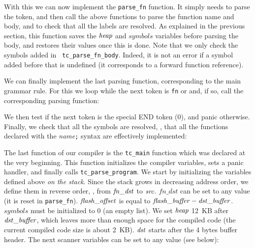 With this we can now implement the {\tt parse\_fn} function. It simply needs to
parse the  token, and then call the above functions to parse the
function name and body, and to check that all the labels are resolved. As
explained in the previous section, this function saves the $\it{heap}$ and
$symbols$ variables before parsing the body, and restores their values once
this is done. Note that we only check the symbols added in {\tt
tc\_parse\_fn\_body}. Indeed, it is not an error if a symbol added before that
is undefined (it corresponds to a forward function reference).


We can finally implement the last parsing function, corresponding to the main
grammar rule. For this we loop while the next token is {\tt fn} or
 and, if so, call the corresponding parsing function:


We then test if the next token is the special END token (0), and panic
otherwise. Finally, we check that all the symbols are resolved, \ie, that all
the functions declared with the  {\em name}{\tt ;} syntax are
effectively implemented:


The last function of our compiler is the {\tt tc\_main} function which was
declared at the very beginning. This function initializes the compiler
variables, sets a panic handler, and finally calls {\tt tc\_parse\_program}. We
start by initializing the variables defined above {\em on the stack}. Since the
stack grows in decreasing address order, we define them in reverse order, \ie,
from $\it{fn\_dst}$ to $\it{src}$. $fn\_dst$ can be set to any value (it is
reset in {\tt parse\_fn}). $\it{flash\_offset}$ is equal to
$\it{flash\_buffer}-\it{dst\_buffer}$. $symbols$ must be initialized to 0 (an
empty list). We set $\it{heap}$ 12~KB after $\it{dst\_buffer}$, which leaves
more than enough space for the compiled code (the current compiled code size is
about 2~KB). $\it{dst}$ starts after the 4 bytes buffer header. The next scanner
variables can be set to any value (see below):

